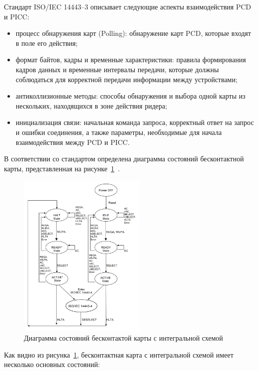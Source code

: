 Стандарт ISO/IEC 14443--3 описывает следующие аспекты взаимодействия PCD и PICC:

\begin{itemize}
    \item процесс обнаружения карт (Polling): обнаружение карт PCD, которые входят в поле его действия;
    \item формат байтов, кадры и временные характеристики: правила формирования кадров данных и временные интервалы передачи, которые должны соблюдаться для корректной передачи информации между устройствами;
    \item антиколлизионные методы: способы обнаружения и выбора одной карты из нескольких, находящихся в зоне действия ридера;
    \item инициализация связи: начальная команда запроса, корректный ответ на запрос и ошибки соединения, а также параметры, необходимые для начала взаимодействия между PCD и PICC.
\end{itemize}

В соответствии со стандартом определена диаграмма состояний бесконтактной карты, представленная на рисунке~\ref{fig:picc_states}~\cite{iso14443-3}.

\begin{figure}[H]
    \centering
    \includegraphics[width=0.55\textwidth]{images/research/picc_states}
    \caption{\centering Диаграмма состояний бесконтактой карты с интегральной схемой}
    \label{fig:picc_states}
\end{figure}

Как видно из рисунка~\ref{fig:picc_states}, бесконтактная карта с интегральной схемой имеет несколько основных состояний:

